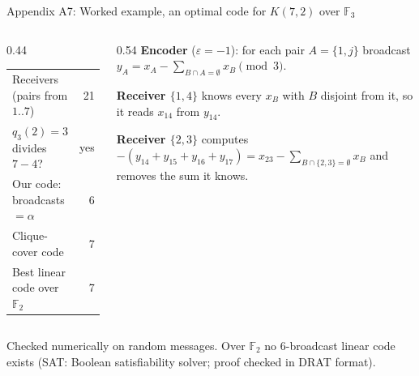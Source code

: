 \documentclass[11pt]{beamer}
\begin{document}
\begin{frame}{Appendix A7: Worked example, an optimal code for $K(7,2)$ over $\mathbb{F}_3$}
  \footnotesize
  \begin{columns}[T]
    \begin{column}{0.44\textwidth}
      \begin{tabular}{@{}lr@{}}
        \toprule
        Receivers (pairs from $1..7$) & 21 \\
        $q_3(2) = 3$ divides $7-4$? & yes \\
        Our code: broadcasts $= \alpha$ & 6 \\
        Clique-cover code & 7 \\
        Best linear code over $\mathbb{F}_2$ & 7 \\
        \bottomrule
      \end{tabular}
    \end{column}
    \begin{column}{0.54\textwidth}
      \textbf{Encoder} ($\varepsilon = -1$): for each pair $A = \{1,j\}$ broadcast
      $y_A = x_A - \sum_{B \cap A = \emptyset} x_B \pmod 3$.\par\smallskip
      \textbf{Receiver $\{1,4\}$} knows every $x_B$ with $B$ disjoint from it, so it reads $x_{14}$ from $y_{14}$.\par\smallskip
      \textbf{Receiver $\{2,3\}$} computes $-(y_{14}+y_{15}+y_{16}+y_{17}) = x_{23} - \sum_{B\cap\{2,3\}=\emptyset} x_B$
      and removes the sum it knows.
    \end{column}
  \end{columns}
  \medskip
  Checked numerically on random messages. Over $\mathbb{F}_2$ no 6-broadcast linear code exists (SAT: Boolean satisfiability solver; proof checked in DRAT format).
\end{frame}
\end{document}
